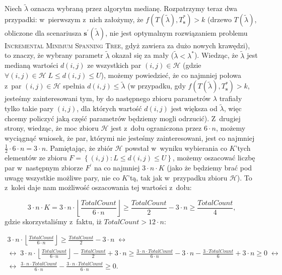 Niech $\tilde{\lambda}$ oznacza wybraną przez algorytm medianę.
Rozpatrzymy teraz dwa przypadki: w~pierwszym z~nich założymy, że $f \left( T \left( \tilde{\lambda} \right), T^{\ast}_{\textbf{s}} \right) > k$ (drzewo $T \left( \tilde{\lambda} \right)$, obliczone dla scenariusza $\textbf{s}^{\prime} \left( \tilde{\lambda} \right)$, nie jest optymalnym rozwiązaniem problemu \textsc{Incremental Minimum Spanning Tree}, gdyż zawiera za dużo nowych krawędzi), to znaczy, że wybrany parametr $\tilde{\lambda}$ okazał się za mały ($\tilde{\lambda} < \lambda^{\ast}$).
Wiedząc, że $\tilde{\lambda}$ jest medianą wartości $d \left( i, j \right)$ ze wszystkich par $\left( i, j \right) \in \mathcal{H}$ (gdzie $\forall \left( i, j \right) \in \mathcal{H} \; L \leqslant d \left( i, j \right) \leqslant U$), możemy powiedzieć, że co najmniej połowa z~par $\left( i, j \right) \in \mathcal{H}$ spełnia $d \left( i, j \right) \leqslant \tilde{\lambda}$ (w przypadku, gdy $f \left( T \left( \tilde{\lambda} \right), T^{\ast}_{\textbf{s}} \right) > k$, jesteśmy zainteresowani tym, by do następnego zbioru parametrów $\lambda$ trafiały tylko takie pary $\left( i, j \right)$, dla których wartość $d \left( i, j \right)$ jest większa od $\tilde{\lambda}$, więc chcemy policzyć jaką część parametrów będziemy mogli odrzucić).
Z~drugiej strony, wiedząc, że moc zbioru $\mathcal{H}$ jest z~dołu ograniczona przez $6 \cdot n$, możemy wyciągnąć wniosek, że par, którymi nie jesteśmy zainteresowani, jest co najmniej $\frac{1}{2} \cdot 6 \cdot n = 3 \cdot n$.
Pamiętając, że zbiór $\mathcal{H}$ powstał w~wyniku wybierania co $K$'tych elementów ze zbioru $F = \left\{ \left(i, j \right) : L \leqslant d \left( i, j \right) \leqslant U \right\}$, możemy oszacować liczbę par w~następnym zbiorze $F^{\prime}$ na co najmniej $3 \cdot n \cdot K$ (jako że będziemy brać pod uwagę wszystkie możliwe pary, nie co $K$'tą, tak jak w~przypadku zbioru $\mathcal{H}$).
To z~kolei daje nam możliwość oszacowania tej wartości z~dołu:

\begin{equation}\label{eq:Hset1}
	3 \cdot n \cdot K = 3 \cdot n \cdot \left\lfloor \frac{TotalCount}{6 \cdot n} \right\rfloor \geqslant \frac{TotalCount}{2} - 3 \cdot n \geqslant \frac{TotalCount}{4}\text{,}
\end{equation}
gdzie skorzystaliśmy z~faktu, iż $TotalCount > 12 \cdot n$:

\begin{gather*}
	3 \cdot n \cdot \left\lfloor \frac{TotalCount}{6 \cdot n} \right\rfloor \geqslant \frac{TotalCount}{2} - 3 \cdot n \; \leftrightarrow \\
	\leftrightarrow \; 3 \cdot n \cdot \left\lfloor \frac{TotalCount}{6 \cdot n} \right\rfloor - \frac{TotalCount}{2} + 3 \cdot n \geqslant \frac{3 \cdot n \cdot TotalCount}{6 \cdot n} - 3 \cdot n - \frac{3 \cdot TotalCount}{6} + 3 \cdot n \geqslant 0 \; \leftrightarrow \\
	\leftrightarrow \; \frac{3 \cdot n \cdot TotalCount}{6 \cdot n} -  \frac{3 \cdot n \cdot TotalCount}{6 \cdot n} \geqslant 0\text{.}
\end{gather*}

